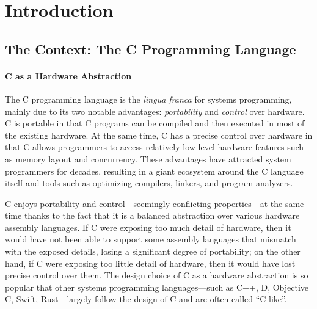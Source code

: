 \section{Introduction}
\label{sec:introduction}

\subsection{The Context: The C Programming Language}

\paragraph{C as a Hardware Abstraction}

The C programming language is the \emph{lingua franca} for systems programming, mainly due to its
two notable advantages: \emph{portability} and \emph{control} over hardware.  C is portable in that
C programs can be compiled and then executed in most of the existing hardware.  At the same time, C
has a precise control over hardware in that C allows programmers to access relatively low-level
hardware features such as memory layout and concurrency.  These advantages have attracted system
programmers for decades, resulting in a giant ecosystem around the C language itself and tools such
as optimizing compilers, linkers, and program analyzers.

C enjoys portability and control---seemingly conflicting properties---at the same time thanks to the
fact that it is a balanced abstraction over various hardware assembly languages.  If C were exposing
too much detail of hardware, then it would have not been able to support some assembly languages
that mismatch with the exposed details, losing a significant degree of portability; on the other
hand, if C were exposing too little detail of hardware, then it would have lost precise control over
them.  The design choice of C as a hardware abstraction is so popular that other systems programming
languages---such as C++, D, Objective C, Swift, Rust---largely follow the design of C and are often
called ``C-like''.




